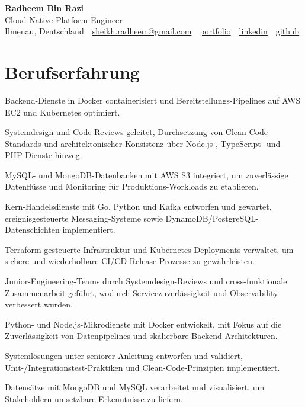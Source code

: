 \documentclass[11pt,a4paper]{resume}
\makeatletter
\newcommand{\Portfolio}{https://radheem.github.io/my-cv}
\newcommand{\PortfolioText}{portfolio}
\newcommand{\GitHub}{https://github.com/radheem}
\newcommand{\LinkedIn}{https://www.linkedin.com/in/radheem-razi}
\newcommand{\Email}{sheikh.radheem@gmail.com}
\makeatother
\begin{document}
\clearpage
{}

\begin{center}
  {\huge\bfseries Radheem Bin Razi}\\[3pt]
  {\large Cloud-Native Platform Engineer}\\[6pt]
  \small
  Ilmenau, Deutschland \,\textbar\,
  \href{mailto:\Email}{\Email} \,\textbar\,
  \href{\Portfolio}{\PortfolioText} \,\textbar\,
  \href{\LinkedIn}{linkedin} \,\textbar\,
  \href{\GitHub}{github}
\end{center}
\vspace{2pt}

\section{Berufserfahrung}

\bullets
  \item Backend-Dienste in Docker containerisiert und Bereitstellungs-Pipelines auf AWS EC2 und Kubernetes optimiert.
  \item Systemdesign und Code-Reviews geleitet, Durchsetzung von Clean-Code-Standards und architektonischer Konsistenz über Node.js-, TypeScript- und PHP-Dienste hinweg.
  \item MySQL- und MongoDB-Datenbanken mit AWS S3 integriert, um zuverlässige Datenflüsse und Monitoring für Produktions-Workloads zu etablieren.
\bulletsend
\vspace{3pt}
\bullets
  \item Kern-Handelsdienste mit Go, Python und Kafka entworfen und gewartet, ereignisgesteuerte Messaging-Systeme sowie DynamoDB/PostgreSQL-Datenschichten implementiert.
  \item Terraform-gesteuerte Infrastruktur und Kubernetes-Deployments verwaltet, um sichere und wiederholbare CI/CD-Release-Prozesse zu gewährleisten.
  \item Junior-Engineering-Teams durch Systemdesign-Reviews und cross-funktionale Zusammenarbeit geführt, wodurch Servicezuverlässigkeit und Observability verbessert wurden.
\bulletsend
\vspace{3pt}
\bullets
  \item Python- und Node.js-Mikrodienste mit Docker entwickelt, mit Fokus auf die Zuverlässigkeit von Datenpipelines und skalierbare Backend-Architekturen.
  \item Systemlösungen unter seniorer Anleitung entworfen und validiert, Unit-/Integrationstest-Praktiken und Clean-Code-Prinzipien implementiert.
  \item Datensätze mit MongoDB und MySQL verarbeitet und visualisiert, um Stakeholdern umsetzbare Erkenntnisse zu liefern.
\bulletsend
\vspace{3pt}
\end{document}
